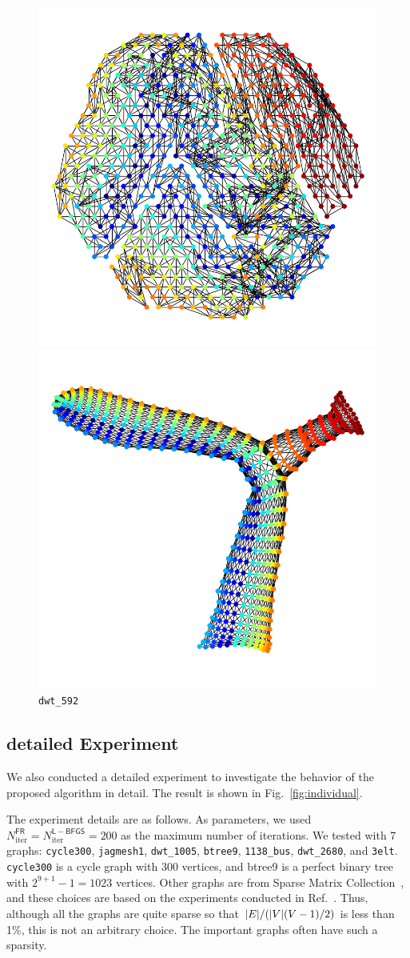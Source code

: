 \documentclass[dvipdfmx,journal]{IEEEtran}
\begin{document}
\begin{figure}[t]
    \centering
    \begin{minipage}{0.49\columnwidth}
        \centering
        \includegraphics[width=0.5\columnwidth]{overall/viz/dwt_592_SN_L_BFGS_first.png}
    \end{minipage}
    \begin{minipage}{0.49\columnwidth}
        \centering
        \includegraphics[width=0.5\columnwidth]{overall/viz/dwt_592_SN_L_BFGS_last.png}
    \end{minipage}
    \caption{\texttt{dwt\_592}}
    \label{fig:dwt_592}
\end{figure}


\subsection{detailed Experiment}\label{ssec:exprDetail}

We also conducted a detailed experiment to investigate the behavior of the proposed algorithm in detail. The result is shown in Fig.~\ref{fig:individual}.

The experiment details are as follows.
As parameters, we used $N_\mathrm{iter}^\mathsf{FR} = N_\mathrm{iter}^\mathsf{L-BFGS} = 200$ as the maximum number of iterations.
We tested with 7 graphs: \texttt{cycle300}, \texttt{jagmesh1}, \texttt{dwt\_1005}, \texttt{btree9}, \texttt{1138\_bus}, \texttt{dwt\_2680}, and \texttt{3elt}. \texttt{cycle300} is a cycle graph with 300 vertices, and btree9 is a perfect binary tree with $2^{9+1}-1=1023$ vertices. Other graphs are from Sparse Matrix Collection~\cite{davis2011university}, and these choices are based on the experiments conducted in Ref.~\cite{8419285}. Thus, although all the graphs are quite sparse so that $\abs{E} / (\abs{V}(V-1)/2)$ is less than 1\%, this is not an arbitrary choice. The important graphs often have such a sparsity.
\end{document}
